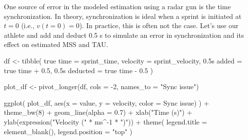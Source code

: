 \documentclass[fleqn,10pt,lineno]{wlpeerj} %
\newenvironment{Shaded}{\begin{snugshade}}{\end{snugshade}}
\newcommand{\AttributeTok}[1]{\textcolor[rgb]{0.77,0.63,0.00}{#1}}
\newcommand{\DecValTok}[1]{\textcolor[rgb]{0.00,0.00,0.81}{#1}}
\newcommand{\FloatTok}[1]{\textcolor[rgb]{0.00,0.00,0.81}{#1}}
\newcommand{\FunctionTok}[1]{\textcolor[rgb]{0.00,0.00,0.00}{#1}}
\newcommand{\NormalTok}[1]{#1}
\newcommand{\OtherTok}[1]{\textcolor[rgb]{0.56,0.35,0.01}{#1}}
\newcommand{\SpecialCharTok}[1]{\textcolor[rgb]{0.00,0.00,0.00}{#1}}
\newcommand{\StringTok}[1]{\textcolor[rgb]{0.31,0.60,0.02}{#1}}
\begin{document}
One source of error in the modeled estimation using a radar gun is the time synchronization. In theory, synchronization is ideal when a sprint is initiated at \(t=0\) (i.e., \(v(t=0) = 0\)). In practice, this is often not the case. Let's use our athlete and add and deduct 0.5 s to simulate an error in synchronization and its effect on estimated MSS and TAU.

\begin{Shaded}
\begin{Highlighting}[]
\NormalTok{df }\OtherTok{\textless{}{-}} \FunctionTok{tibble}\NormalTok{(}
  \StringTok{\textasciigrave{}}\AttributeTok{true time}\StringTok{\textasciigrave{}} \OtherTok{=}\NormalTok{ sprint\_time,}
  \AttributeTok{velocity =}\NormalTok{ sprint\_velocity,}
  \StringTok{\textasciigrave{}}\AttributeTok{0.5s added}\StringTok{\textasciigrave{}} \OtherTok{=} \StringTok{\textasciigrave{}}\AttributeTok{true time}\StringTok{\textasciigrave{}} \SpecialCharTok{+} \FloatTok{0.5}\NormalTok{,}
  \StringTok{\textasciigrave{}}\AttributeTok{0.5s deducted}\StringTok{\textasciigrave{}} \OtherTok{=} \StringTok{\textasciigrave{}}\AttributeTok{true time}\StringTok{\textasciigrave{}} \SpecialCharTok{{-}} \FloatTok{0.5}
\NormalTok{)}

\NormalTok{plot\_df }\OtherTok{\textless{}{-}} \FunctionTok{pivot\_longer}\NormalTok{(df, }\AttributeTok{cols =} \SpecialCharTok{{-}}\DecValTok{2}\NormalTok{, }\AttributeTok{names\_to =} \StringTok{"Sync issue"}\NormalTok{)}

\FunctionTok{ggplot}\NormalTok{(}
\NormalTok{  plot\_df,}
  \FunctionTok{aes}\NormalTok{(}\AttributeTok{x =}\NormalTok{ value, }\AttributeTok{y =}\NormalTok{ velocity, }\AttributeTok{color =} \StringTok{\textasciigrave{}}\AttributeTok{Sync issue}\StringTok{\textasciigrave{}}\NormalTok{)}
\NormalTok{) }\SpecialCharTok{+}
  \FunctionTok{theme\_bw}\NormalTok{(}\DecValTok{8}\NormalTok{) }\SpecialCharTok{+}
  \FunctionTok{geom\_line}\NormalTok{(}\AttributeTok{alpha =} \FloatTok{0.7}\NormalTok{) }\SpecialCharTok{+}
  \FunctionTok{xlab}\NormalTok{(}\StringTok{"Time (s)"}\NormalTok{) }\SpecialCharTok{+}
  \FunctionTok{ylab}\NormalTok{(}\FunctionTok{expression}\NormalTok{(}\StringTok{"Velocity ("} \SpecialCharTok{*}\NormalTok{ ms}\SpecialCharTok{\^{}{-}}\DecValTok{1} \SpecialCharTok{*} \StringTok{")"}\NormalTok{)) }\SpecialCharTok{+}
  \FunctionTok{theme}\NormalTok{(}
    \AttributeTok{legend.title =} \FunctionTok{element\_blank}\NormalTok{(),}
    \AttributeTok{legend.position =} \StringTok{"top"}
\NormalTok{  )}
\end{Highlighting}
\end{Shaded}
\end{document}
